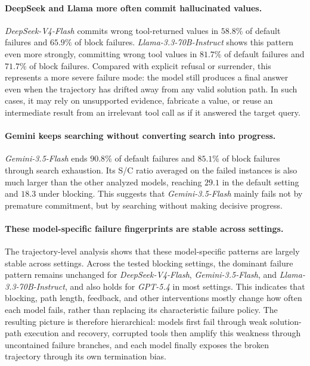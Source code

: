 \documentclass{llmxive}
\begin{document}
\paragraph{DeepSeek and Llama more often commit hallucinated values.}
\textit{DeepSeek-V4-Flash} commits wrong tool-returned values in $58.8\%$ of default failures and $65.9\%$ of block failures.
\textit{Llama-3.3-70B-Instruct} shows this pattern even more strongly, committing wrong tool values in $81.7\%$ of default failures and $71.7\%$ of block failures.
Compared with explicit refusal or surrender, this represents a more severe failure mode: the model still produces a final answer even when the trajectory has drifted away from any valid solution path. 
In such cases, it may rely on unsupported evidence, fabricate a value, or reuse an intermediate result from an irrelevant tool call as if it answered the target query.


\paragraph{Gemini keeps searching without converting search into progress.}
\textit{Gemini-3.5-Flash} ends $90.8\%$ of default failures and $85.1\%$ of block failures through search exhaustion.
Its S/C ratio averaged on the failed instances is also much larger than the other analyzed models, reaching $29.1$ in the default setting and $18.3$ under blocking.
This suggests that \textit{Gemini-3.5-Flash} mainly fails not by premature commitment, but by searching without making decisive progress.

\paragraph{These model-specific failure fingerprints are stable across settings.}
The trajectory-level analysis shows that these model-specific patterns are largely stable across settings.
Across the tested blocking settings, the dominant failure pattern remains unchanged for \textit{DeepSeek-V4-Flash}, \textit{Gemini-3.5-Flash}, and \textit{Llama-3.3-70B-Instruct}, and also holds for \textit{GPT-5.4} in most settings.
This indicates that blocking, path length, feedback, and other interventions mostly change how often each model fails, rather than replacing its characteristic failure policy.
The resulting picture is therefore hierarchical: models first fail through weak solution-path execution and recovery, corrupted tools then amplify this weakness through uncontained failure branches, and each model finally exposes the broken trajectory through its own termination bias.
\end{document}

